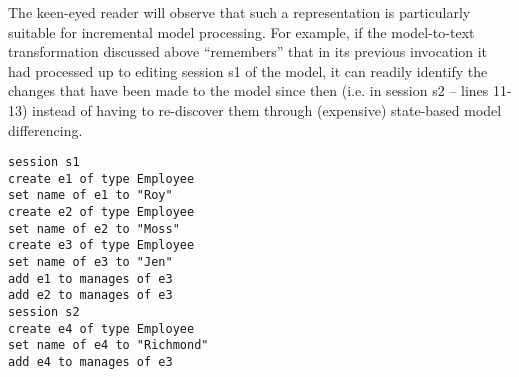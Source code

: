 \documentclass{llncs}
\begin{document}
The keen-eyed reader will observe that such a representation is particularly suitable for incremental
model processing. For example, if the model-to-text transformation discussed above “remembers”
that in its previous invocation it had processed up to editing session s1 of the model, it can readily
identify the changes that have been made to the model since then (i.e. in session s2 – lines 11-13)
instead of having to re-discover them through (expensive) state-based model differencing.

\begin{lstlisting}[style=cbp,caption={Proposed change-based representation of the model of Figure 4.},label=cbpmodel1]
session s1
create e1 of type Employee
set name of e1 to "Roy"
create e2 of type Employee
set name of e2 to "Moss"
create e3 of type Employee
set name of e3 to "Jen"
add e1 to manages of e3
add e2 to manages of e3
session s2
create e4 of type Employee
set name of e4 to "Richmond"
add e4 to manages of e3
\end{lstlisting}
\end{document}
